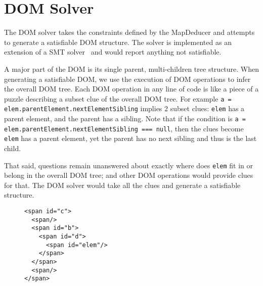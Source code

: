 \section{DOM Solver}
The DOM solver takes the constraints defined by the MapDeducer and attempts to generate a satisfiable DOM structure.  The solver is implemented as an extension of a SMT solver~\cite{cvc3} and would report anything not satisfiable.  

A major part of the DOM is its single parent, multi-children tree structure.  When generating a satisfiable DOM, we use the execution of DOM operations to infer the overall DOM tree.    
Each DOM operation in any line of code is like a piece of a puzzle describing a subset clue of the overall DOM tree.   
For example {\tt a = elem.parentElement.nextElementSibling} implies 2 subset clues: {\tt elem} has a parent element, and the parent has a sibling.  
Note that if the condition is {\tt a = elem.parentElement.nextElementSibling === null}, then the clues become {\tt elem} has a parent element, yet the parent has no next sibling and thus is the last child.

That said, questions remain unanswered about exactly where does {\tt elem} fit in or belong in the overall DOM tree; and other DOM operations would provide clues for that.  The DOM solver would take all the clues and generate a satisfiable structure.   

\begin{figure}
\begin{lstlisting}[caption=HTML generated for guiding the execution to follow the {\tt true} branch in the {\tt if} statement in Sample Code\ref{dom0}.label=htmlExtended]  
<span id="c">
  <span/>
  <span id="b">
    <span id="d">
      <span id="elem"/>
    </span>
  </span>
  <span/>
</span>
\end{lstlisting}
\end{figure}



